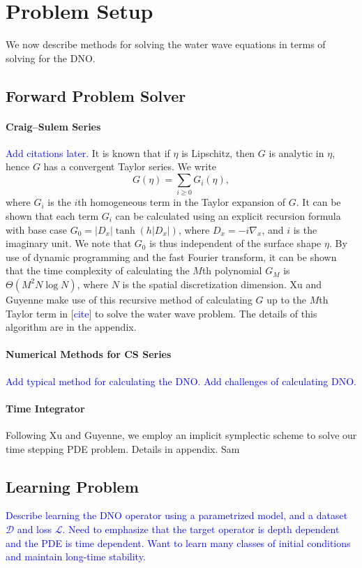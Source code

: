 \documentclass{article}
\begin{document}
\section{Problem Setup}
We now describe methods for solving the water wave equations in terms of
solving for the DNO.

\subsection{Forward Problem Solver}
\paragraph{Craig--Sulem Series}
\textcolor{blue}{Add citations later.}
It is known that if $\eta$ is Lipschitz, then $G$ is analytic in $\eta$,
hence $G$ has a convergent Taylor series. We write
\begin{equation}
    G(\eta)=\sum_{i\geq0}G_i(\eta),
    \label{eq:cs}
\end{equation}
where $G_i$ is the $i$th homogeneous term in the Taylor expansion of $G$.
It can be shown that each term $G_i$ can be calculated using an explicit
recursion formula with base case $G_0=|D_x|\tanh(h|D_x|)$, where
$D_x=-i\nabla_x$, and $i$ is the imaginary unit. We note that $G_0$ is thus
independent of the surface shape $\eta$. By use of dynamic programming and
the fast Fourier transform, it can be shown that the time complexity of
calculating the $M$th polynomial $G_M$ is $\Theta(M^2N\log N)$, where $N$
is the spatial discretization dimension. Xu and Guyenne make use of this
recursive method of calculating $G$ up to the $M$th Taylor term in
[\textcolor{blue}{cite}] to solve the water wave problem. The details of this
algorithm are in the appendix.

\paragraph{Numerical Methods for CS Series}
\textcolor{blue}{Add typical method for calculating the DNO. Add challenges
of calculating DNO.}

\paragraph{Time Integrator}
Following Xu and Guyenne, we employ an implicit symplectic scheme to solve
our time stepping PDE problem. Details in appendix.
\textcolor{green!50!black}{Sam}

\subsection{Learning Problem}
\textcolor{blue}{Describe learning the DNO operator using a parametrized
model, and a dataset $\mathcal D$ and loss $\mathcal L$. Need to emphasize
that the target operator is depth dependent and the PDE is time dependent.
Want to learn many classes of initial conditions and maintain long-time
stability.}
\end{document}
